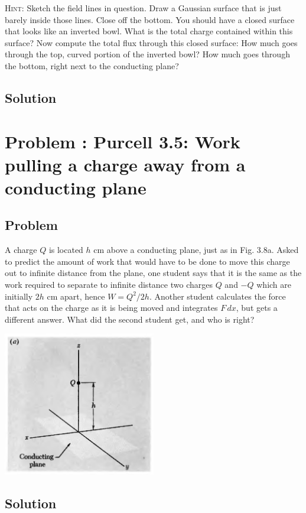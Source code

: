 \documentclass[solutions]{esg8022pset}
\renewcommand{\d}{\,d}
\begin{document}
  \noindent \textsc{Hint}: Sketch the field lines in question.  Draw
  a Gaussian surface that is just barely inside those lines.  Close
  off the bottom.  You should have a closed surface that looks like
  an inverted bowl.  What is the total charge contained within this
  surface?  Now compute the total flux through this closed surface:
  How much goes through the top, curved portion of the inverted bowl?
  How much goes through the bottom, right next to the conducting plane?
\subsection{Solution}

\section{Problem \thesection: Purcell 3.5: Work pulling a charge away from a conducting plane}
\subsection{Problem}
  A charge $Q$ is located $h$ cm above a conducting plane, just as
  in Fig. 3.8a. Asked to predict the amount of work that would have
  to be done to move this charge out to infinite distance from the
  plane, one student says that it is the same as the work required to
  separate to infinite distance two charges $Q$ and $-Q$ which are
  initially $2h$ cm apart, hence $W = Q^2 / 2h$. Another student
  calculates the force that acts on the charge as it is being moved
  and integrates $F \d x$, but gets a different answer. What did the
  second student get, and who is right?
  \begin{center}\includegraphics[width=0.5\textwidth]{ps04_03}\end{center}
\subsection{Solution}
\end{document}
